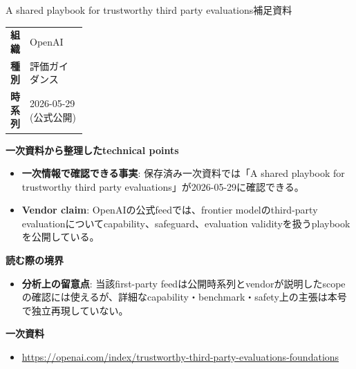 \begin{technicalnote}{A shared playbook for trustworthy third party evaluations}{補足資料}
\begingroup
\begin{tabularx}{\linewidth}{@{}>{\bfseries}p{0.22\linewidth}X@{}}
組織 & OpenAI \\
種別 & 評価ガイダンス \\
時系列 & 2026-05-29 (公式公開) \\
\end{tabularx}
\smallskip
{\bfseries 一次資料から整理したtechnical points}
\begin{itemize}[leftmargin=1.5em,itemsep=0.35em]
\item \textbf{一次情報で確認できる事実}: 保存済み一次資料では「A shared playbook for trustworthy third party evaluations」が2026-05-29に確認できる。
\end{itemize}
\begin{minipage}{\linewidth}
\begin{itemize}[leftmargin=1.5em,itemsep=0.35em]
\item \textbf{Vendor claim}: OpenAIの公式feedでは、frontier modelのthird-party evaluationについてcapability、safeguard、evaluation validityを扱うplaybookを公開している。
\end{itemize}
{\bfseries 読む際の境界}
\begin{itemize}[leftmargin=1.5em,itemsep=0.35em]
\item \textbf{分析上の留意点}: 当該first-party feedは公開時系列とvendorが説明したscopeの確認には使えるが、詳細なcapability・benchmark・safety上の主張は本号で独立再現していない。
\end{itemize}
\begin{samepage}
{\bfseries 一次資料}
\begingroup\sloppy
\begin{itemize}[leftmargin=1.5em,itemsep=0.25em]
\item {\scriptsize\url{https://openai.com/index/trustworthy-third-party-evaluations-foundations}}
\end{itemize}
\endgroup
\end{samepage}
\end{minipage}
\endgroup
\end{technicalnote}
\medskip
